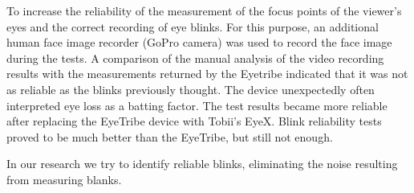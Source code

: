 \documentclass[runningheads,a4paper]{llncs}
\begin{document}
To increase the reliability of the measurement of the focus points of the viewer's eyes and the correct recording of eye blinks. For this purpose, an additional human face image recorder (GoPro camera) was used to record the face image during the tests.
A comparison of the manual analysis of the video recording results with the measurements returned by the Eyetribe indicated that it was not as reliable as the blinks previously thought.
The device unexpectedly often interpreted eye loss as a batting factor. The test results became more reliable after replacing the EyeTribe device with Tobii's EyeX. Blink reliability tests proved to be much better than the EyeTribe, but still not enough.

In our research we try to identify reliable blinks, eliminating the noise resulting from measuring blanks.






\end{document}
